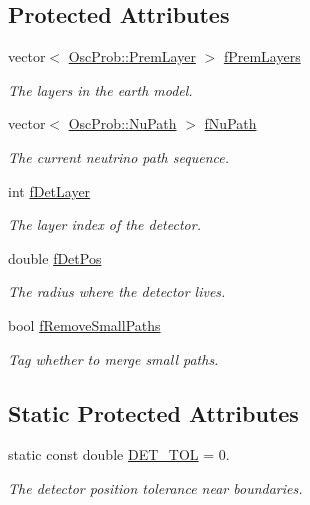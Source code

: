 \subsection*{Protected Attributes}
\begin{DoxyCompactItemize}
\item 
vector$<$ \hyperlink{structOscProb_1_1PremLayer}{Osc\+Prob\+::\+Prem\+Layer} $>$ \hyperlink{classOscProb_1_1PremModel_ac33265ceae42c59a5e11ca416eff93b0}{f\+Prem\+Layers}
\begin{DoxyCompactList}\small\item\em The layers in the earth model. \end{DoxyCompactList}\item 
vector$<$ \hyperlink{structOscProb_1_1NuPath}{Osc\+Prob\+::\+Nu\+Path} $>$ \hyperlink{classOscProb_1_1PremModel_afb5674b8b06add6b981e557d7b07016c}{f\+Nu\+Path}
\begin{DoxyCompactList}\small\item\em The current neutrino path sequence. \end{DoxyCompactList}\item 
int \hyperlink{classOscProb_1_1PremModel_a4fb68506493666349f418b893a996185}{f\+Det\+Layer}
\begin{DoxyCompactList}\small\item\em The layer index of the detector. \end{DoxyCompactList}\item 
double \hyperlink{classOscProb_1_1PremModel_ab12ea0343cd11b9233ffd20ab5e620c7}{f\+Det\+Pos}
\begin{DoxyCompactList}\small\item\em The radius where the detector lives. \end{DoxyCompactList}\item 
bool \hyperlink{classOscProb_1_1PremModel_a3973df6f5f2ff219cd2f865b31aacfd2}{f\+Remove\+Small\+Paths}
\begin{DoxyCompactList}\small\item\em Tag whether to merge small paths. \end{DoxyCompactList}\end{DoxyCompactItemize}
\subsection*{Static Protected Attributes}
\begin{DoxyCompactItemize}
\item 
static const double \hyperlink{classOscProb_1_1PremModel_a8ad1335ebe80ee1cd1cdf59d774ab34b}{D\+E\+T\+\_\+\+T\+OL} = 0.
\begin{DoxyCompactList}\small\item\em The detector position tolerance near boundaries. \end{DoxyCompactList}\end{DoxyCompactItemize}


